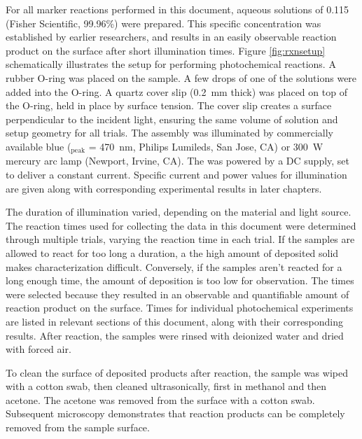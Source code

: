 For all marker reactions performed in this document, aqueous solutions of 0.115~\Molar
{} (Fisher Scientific, 99.96\%) were prepared. This specific concentration was
established by earlier
researchers,\cite{Giocondi:2001gz,Burbure:2010go,Giocondi:2001bi,Burbure:2010ti,Bhardwaj:2010eh,%
Giocondi:2008ja,Lowekamp:1998ks,MorrisHotsenpiller:1998jq} and results in an easily
observable reaction product on the surface after short illumination times.  Figure
\ref{fig:rxnsetup} schematically illustrates the setup for performing photochemical
reactions. A rubber O-ring was placed on the sample. A few drops of one of the solutions
were added into the O-ring. A quartz cover slip (\SI{0.2}{\milli\meter} thick) was placed
on top of the O-ring, held in place by surface tension. The cover slip creates a surface
perpendicular to the incident light, ensuring the same volume of solution and setup
geometry for all trials. The assembly was illuminated by commercially available blue
 (\textlambda{}$_{\text{peak}}$ = \SI{470}{\nano\meter}, Philips Lumileds, San
Jose, CA) or \SI{300}{\watt} mercury arc lamp (Newport, Irvine, CA). The  was
powered by a DC supply, set to deliver a constant current. Specific current and power
values for illumination are given along with corresponding experimental results in later
chapters. 

The duration of illumination varied, depending on the material and light source. The
reaction times used for collecting the data in this document were determined through
multiple trials, varying the reaction time in each trial. If the samples are allowed to
react for too long a duration, a the high amount of deposited solid makes characterization
difficult. Conversely, if the samples aren't reacted for a long enough time, the amount of
deposition is too low for observation. The times were selected because they resulted in an
observable and quantifiable amount of reaction product on the surface. Times for
individual photochemical experiments are listed in relevant sections of this document,
along with their corresponding results. After reaction, the samples were rinsed with
deionized water and dried with forced air.

To clean the surface of deposited products after reaction, the sample was wiped with a
cotton swab, then cleaned ultrasonically, first in methanol and then acetone. The acetone
was removed from the surface with a cotton swab. Subsequent microscopy demonstrates that
reaction products can be completely removed from the sample surface.

